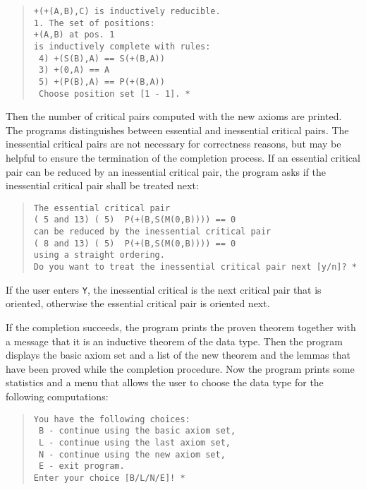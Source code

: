 \begin{quote}
\begin{verbatim} 
+(+(A,B),C) is inductively reducible.
1. The set of positions: 
+(A,B) at pos. 1
is inductively complete with rules: 
 4) +(S(B),A) == S(+(B,A))
 3) +(0,A) == A
 5) +(P(B),A) == P(+(B,A))
 Choose position set [1 - 1]. *
\end{verbatim}
\end{quote}

Then the number of critical pairs computed with the new axioms are 
printed. The programs distinguishes between essential and inessential
critical pairs. The inessential critical pairs are not 
necessary for correctness reasons, but may be helpful to ensure the 
termination of the completion process.
If an essential critical pair can be reduced by an inessential critical
pair, the program asks if the inessential critical pair shall be treated next:

\begin{quote}
\begin{verbatim}
The essential critical pair
( 5 and 13) ( 5)  P(+(B,S(M(0,B)))) == 0
can be reduced by the inessential critical pair
( 8 and 13) ( 5)  P(+(B,S(M(0,B)))) == 0
using a straight ordering.
Do you want to treat the inessential critical pair next [y/n]? *
\end{verbatim}
\end{quote}
If the user enters {\tt Y}, the
inessential critical is the next critical pair that is oriented,
otherwise the essential critical pair is oriented next.

If the completion succeeds, the program prints the proven theorem
together with a message that it is an inductive theorem of the data 
type. Then the program displays the basic axiom set and a list of
the new theorem and the lemmas that have
been proved while the completion procedure. Now the program prints 
some statistics and a menu that allows the user to choose the data 
type for the following computations:

\begin{quote}
\begin{verbatim}
You have the following choices: 
 B - continue using the basic axiom set,
 L - continue using the last axiom set,
 N - continue using the new axiom set,
 E - exit program.
Enter your choice [B/L/N/E]! *
\end{verbatim}
\end{quote}

